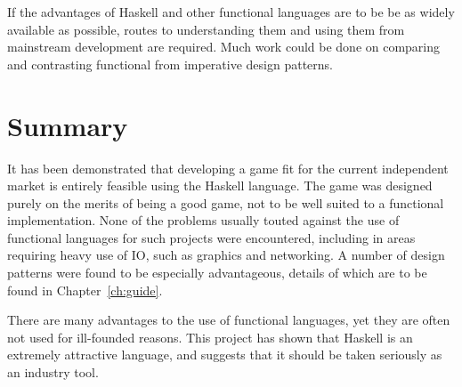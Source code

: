 If the advantages of Haskell and other functional languages are to be be as widely available as possible, routes to understanding them and using them from mainstream development are required. Much work could be done on comparing and contrasting functional from imperative design patterns. 

\section{Summary}

It has been demonstrated that developing a game fit for the current independent market is entirely feasible using the Haskell language. The game was designed purely on the merits of being a good game, not to be well suited to a functional implementation. None of the problems usually touted against the use of functional languages for such projects were encountered, including in areas requiring heavy use of IO, such as graphics and networking. A number of design patterns were found to be especially advantageous, details of which are to be found in Chapter~\ref{ch:guide}. 

There are many advantages to the use of functional languages, yet they are often not used for ill-founded reasons. This project has shown that Haskell is an extremely attractive language, and suggests that it should be taken seriously as an industry tool.

